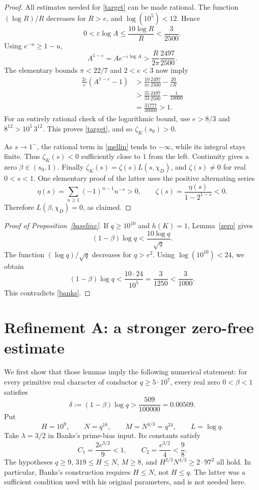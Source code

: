\documentclass[11pt]{article}
\newcommand{\zK}{\zeta_K}
\begin{document}
\begin{proof}
All estimates needed for \eqref{target} can be made rational.
The function \((\log R)/R\) decreases for \(R>e\), and
\(\log(10^5)<12\). Hence
\[
 0<\varepsilon\log A
 \le\frac{10\log R}{R}<\frac{3}{2500}.
\]
Using \(e^{-u}\ge1-u\),
\[
 A^{1-\varepsilon}
   = A e^{-\varepsilon\log A}
   >\frac{R}{2\pi}\frac{2497}{2500}.
\]
The elementary bounds \(\pi<22/7\) and \(2<e<3\) now imply
\begin{align*}
 \frac{2\varepsilon}{e}(A^{1-\varepsilon}-1)
 &>\frac{10}{\pi e}\frac{2497}{2500}-\frac{20}{eR}\\
 &>\frac{35}{33}\frac{2497}{2500}-\frac{1}{10000}\\
 &=\frac{31777}{30000}>1.
\end{align*}
For an entirely rational check of the logarithmic bound, use
\(e>8/3\) and \(8^{12}>10^5\,3^{12}\).
This proves \eqref{target}, and so \(\zK(s_0)>0\).

As \(s\to1^-\), the rational term in \eqref{mellin} tends to
\(-\infty\), while its integral stays finite. Thus \(\zK(s)<0\)
sufficiently close to \(1\) from the left.
Continuity gives a zero \(\beta\in(s_0,1)\).
Finally \(\zK(s)=\zeta(s)L(s,\chi_D)\), and \(\zeta(s)\ne0\) for
real \(0<s<1\). One elementary proof of the latter uses the positive
alternating series
\[
 \eta(s)=\sum_{n\ge1}(-1)^{n-1}n^{-s}>0,\qquad
 \zeta(s)=\frac{\eta(s)}{1-2^{1-s}}<0.
\]
Therefore \(L(\beta,\chi_D)=0\), as claimed.
\end{proof}

\begin{proof}[Proof of Proposition~\ref{baseline}]
If \(q\ge10^{10}\) and \(h(K)=1\), Lemma~\ref{zero} gives
\[
 (1-\beta)\log q < \frac{10\log q}{\sqrt q}.
\]
The function \((\log q)/\sqrt q\) decreases for \(q>e^2\).
Using \(\log(10^{10})<24\), we obtain
\[
 (1-\beta)\log q
 < \frac{10\cdot24}{10^5}
 =\frac{3}{1250}<\frac{3}{1000}.
\]
This contradicts \eqref{banks}.
\end{proof}

\section{Refinement A: a stronger zero-free estimate}\label{sec-refined-banks}

We first show that those lemmas imply the following numerical statement:
for every primitive real character of conductor \(q\ge 5\cdot10^7\),
every real zero \(0<\beta<1\) satisfies
\begin{equation}\label{lower}
             \delta:=(1-\beta)\log q>\frac{509}{100000}=0.00509.
\end{equation}
Put
\[
 H=10^9,\qquad N=q^{18},\qquad M=N^{4/3}=q^{24},
 \qquad L=\log q.
\]
Take \(\lambda=3/2\) in Banks's prime-bias input. Its constants satisfy
\[
 C_1=\frac{2e^{3/2}}9<1,\qquad
 C_2=\frac{e^{3/2}}4<\frac98.
\]
The hypotheses \(q\ge9\), \(319\le H\le N\), \(M\ge8\), and
\(H^{2/3}N^{4/3}\ge 2\cdot97^2\) all hold.
In particular, Banks's construction requires \(H\le N\), not \(H\le q\).
The latter was a sufficient condition used with his original parameters,
and is not needed here.
\end{document}
